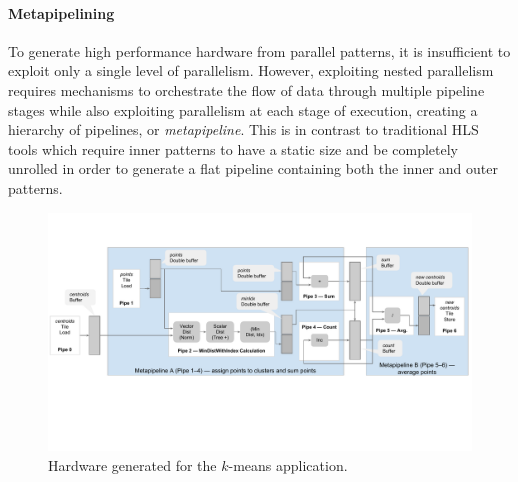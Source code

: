 \paragraph{Metapipelining}
To generate high performance hardware from parallel patterns, it is insufficient to exploit only a single level of parallelism.
However, exploiting nested parallelism requires mechanisms to orchestrate
the flow of data through multiple pipeline stages while also exploiting parallelism at each stage of execution,
creating a hierarchy of pipelines, or \emph{metapipeline}.
This is in contrast to traditional HLS tools which require inner patterns to have a static size and be completely unrolled in order to generate a flat pipeline containing both the inner and outer patterns.




\begin{figure} \centering\includegraphics[clip=true,width=7in,trim=0in 0in
0in 0in]{figs/amazingmetapipelining.pdf}\caption{Hardware generated for the $k$-means application.}
\label{fig:metapipelining}
\end{figure}

